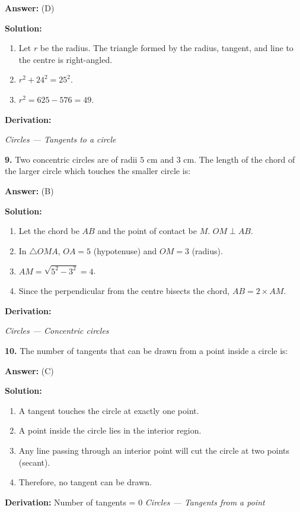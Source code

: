 \documentclass[12pt,a4paper]{exam}
\newcommand{\fitmath}[1]{%
  \sbox{\schmathbox}{$\displaystyle #1$}%
  \ifdim\wd\schmathbox>\linewidth
    \resizebox{\linewidth}{!}{\usebox{\schmathbox}}%
  \else
    \usebox{\schmathbox}%
  \fi}
\begin{document}
\begin{questions}
\textbf{Answer:}
(D)

\textbf{Solution:}
\begin{enumerate}
  \item Let $r$ be the radius. The triangle formed by the radius, tangent, and line to the centre is right-angled.
  \item $r^2 + 24^2 = 25^2$.
  \item $r^2 = 625 - 576 = 49$.
\end{enumerate}
\textbf{Derivation:}
\begin{center}
\fitmath{r = \sqrt{49} = 7 \text{ cm}}
\end{center}
\hfill \textit{Circles — Tangents to a circle}
\vspace{0.3cm}

\question \textbf{9.} Two concentric circles are of radii $5 \text{ cm}$ and $3 \text{ cm}$. The length of the chord of the larger circle which touches the smaller circle is:

\textbf{Answer:}
(B)

\textbf{Solution:}
\begin{enumerate}
  \item Let the chord be $AB$ and the point of contact be $M$. $OM \perp AB$.
  \item In $\triangle OMA$, $OA=5$ (hypotenuse) and $OM=3$ (radius).
  \item $AM = \sqrt{5^2 - 3^2} = 4$.
  \item Since the perpendicular from the centre bisects the chord, $AB = 2 \times AM$.
\end{enumerate}
\textbf{Derivation:}
\begin{center}
\fitmath{AB = 2 \times 4 = 8 \text{ cm}}
\end{center}
\hfill \textit{Circles — Concentric circles}
\vspace{0.3cm}

\question \textbf{10.} The number of tangents that can be drawn from a point inside a circle is:

\textbf{Answer:}
(C)

\textbf{Solution:}
\begin{enumerate}
  \item A tangent touches the circle at exactly one point.
  \item A point inside the circle lies in the interior region.
  \item Any line passing through an interior point will cut the circle at two points (secant).
  \item Therefore, no tangent can be drawn.
\end{enumerate}
\textbf{Derivation:}
Number of tangents = 0
\hfill \textit{Circles — Tangents from a point}
\vspace{0.3cm}


\end{questions}
\end{document}
